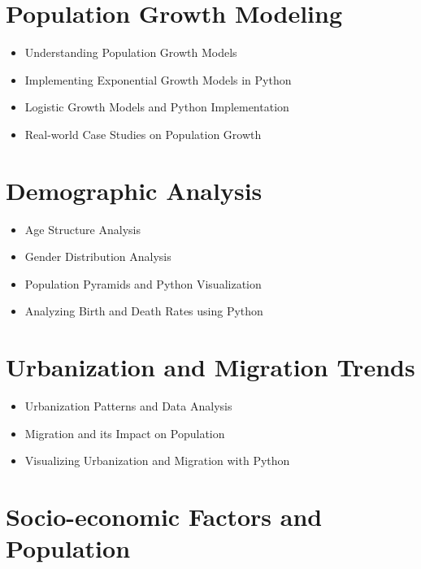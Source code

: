 \documentclass[
]{book}
\providecommand{\tightlist}{%
  \setlength{\itemsep}{0pt}\setlength{\parskip}{0pt}}\usepackage{longtable,booktabs,array}
\begin{document}
\hypertarget{population-growth-modeling}{%
\chapter{\texorpdfstring{\textbf{Population Growth
Modeling}}{Population Growth Modeling}}\label{population-growth-modeling}}

\begin{itemize}
\tightlist
\item
  Understanding Population Growth Models
\item
  Implementing Exponential Growth Models in Python
\item
  Logistic Growth Models and Python Implementation
\item
  Real-world Case Studies on Population Growth
\end{itemize}

\hypertarget{demographic-analysis}{%
\chapter{\texorpdfstring{\textbf{Demographic
Analysis}}{Demographic Analysis}}\label{demographic-analysis}}

\begin{itemize}
\tightlist
\item
  Age Structure Analysis
\item
  Gender Distribution Analysis
\item
  Population Pyramids and Python Visualization
\item
  Analyzing Birth and Death Rates using Python
\end{itemize}

\hypertarget{urbanization-and-migration-trends}{%
\chapter{\texorpdfstring{\textbf{Urbanization and Migration
Trends}}{Urbanization and Migration Trends}}\label{urbanization-and-migration-trends}}

\begin{itemize}
\tightlist
\item
  Urbanization Patterns and Data Analysis
\item
  Migration and its Impact on Population
\item
  Visualizing Urbanization and Migration with Python
\end{itemize}

\hypertarget{socio-economic-factors-and-population}{%
\chapter{\texorpdfstring{\textbf{Socio-economic Factors and
Population}}{Socio-economic Factors and Population}}\label{socio-economic-factors-and-population}}
\end{document}
